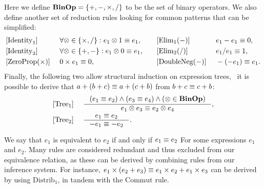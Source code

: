 Here we define $\mathbf{BinOp} = \{ +, -, \times, / \}$ to be the set of binary
operators.  We also define another set of reduction rules looking for common
patterns that can be simplified:
\begin{equation}
    \begin{aligned}{}
        & [\mathrm{Identity}_1] &~&
            \forall \otimes \in \{ \times, / \}:
            e_1 \otimes 1 \equiv e_1,
            & \quad
        & [\mathrm{Elim}_1 (-)] &~&
            e_1 - e_1 \equiv 0,
            \\
        & [\mathrm{Identity}_2] &~&
            \forall \otimes \in \{ +, - \}:
            e_1 \otimes 0 \equiv e_1,
            & \quad
        & [\mathrm{Elim}_2 (/)] &~&
            e_1 / e_1 \equiv 1,
            \\
        & [\mathrm{ZeroProp} (\times)] &~&
            0 \times e_1 \equiv 0,
            & \quad
        & [\mathrm{DoubleNeg} (-)] &~&
            -(-e_1) \equiv e_1.
            \\
    \end{aligned}
    \label{so:eq:common_reduction}
\end{equation}
Finally, the following two allow structural induction on expression trees,
\eg~it is possible to derive that $a + (b + c) \equiv a + (c + b)$ from $b + c
\equiv c + b$:
\begin{equation}
    \begin{aligned}
        & [\mathrm{Tree}_1] &~&
        \inference{%
            \left( e_1 \eqrel e_2 \right) \wedge
            \left( e_3 \eqrel e_4 \right) \wedge
            \left( \opsymbol \in \binopset \right)
        }{%
            e_1 \opsymbol e_3 \eqrel e_2 \opsymbol e_4
        }, \\
        & [\mathrm{Tree}_2] &~&
        \inference{%
            e_1 \eqrel e_2
        }{%
            -e_1 \eqrel -e_2
        }.
    \end{aligned}
    \label{so:eq:equivalence_tree}
\end{equation}

We say that $e_1$ is equivalent to $e_2$ if and only if $e_1 \equiv e_2$ For
some expressions $e_1$ and $e_2$.  Many rules are considered redundant and thus
excluded from our equivalence relation, as these can be derived by combining
rules from our inference system.  For instance, $e_1 \times (e_2 + e_3) \equiv
e_1 \times e_2 + e_1 \times e_3$ can be derived by using $\mathrm{Distrib}_1$,
in tandem with the $\mathrm{Commut}$ rule.


